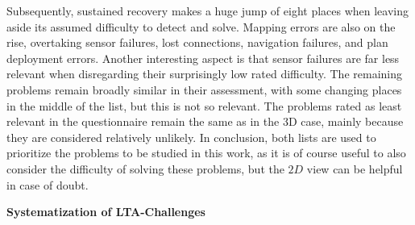 \documentclass[english, master, utf8]{base/thesis_KBS}
\begin{document}
Subsequently, sustained recovery makes a huge jump of eight places when leaving aside its assumed difficulty to detect and solve.
Mapping errors are also on the rise, overtaking sensor failures, lost connections, navigation failures, and plan deployment errors.
Another interesting aspect is that sensor failures are far less relevant when disregarding their surprisingly low rated difficulty.
The remaining problems remain broadly similar in their assessment, with some changing places in the middle of the list, but this is not so relevant.
The problems rated as least relevant in the questionnaire remain the same as in the 3D case, mainly because they are considered relatively unlikely.
In conclusion, both lists are used to prioritize the problems to be studied in this work, as it is of course useful to also consider the difficulty of 
solving these problems, but the $2D$ view can be helpful in case of doubt.\newline

\noindent
\textbf{Systematization of LTA-Challenges}\newline
\end{document}
